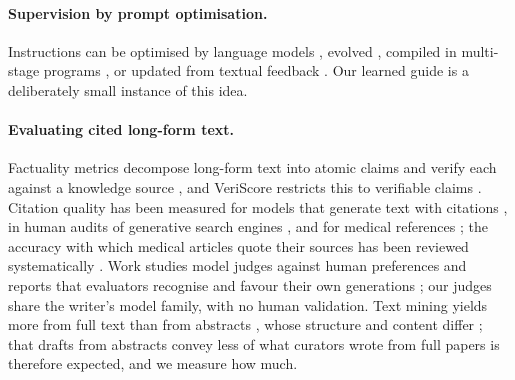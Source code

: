 \documentclass{article} %
\begin{document}
\paragraph{Supervision by prompt optimisation.}
Instructions can be optimised by language models \citep{Zhou2022LargeLanguage,Pryzant2023AutomaticPrompt,Yang2023LargeLanguage}, evolved \citep{Guo2023EvopromptConnecting,Fernando2023PromptbreederSelfreferential,agrawal2026gepa}, compiled in multi-stage programs \citep{Khattab2023DspyCompiling,Opsahlong2024OptimizingInstructions}, or updated from textual feedback \citep{Yuksekgonul2024TextgradAutomatic}. Our learned guide is a deliberately small instance of this idea.

\paragraph{Evaluating cited long-form text.}
Factuality metrics decompose long-form text into atomic claims and verify each against a knowledge source \citep{min2023factscore,wei2024longform}, and VeriScore restricts this to verifiable claims \citep{Song2024VeriscoreEvaluating}. Citation quality has been measured for models that generate text with citations \citep{gao2023enabling}, in human audits of generative search engines \citep{Liu2023EvaluatingVerifiability}, and for medical references \citep{wu2025automated}; the accuracy with which medical articles quote their sources has been reviewed systematically \citep{jergas2015quotation}. Work studies model judges against human preferences \citep{zheng2023judging,shankar2024who} and reports that evaluators recognise and favour their own generations \citep{panickssery2024llm}; our judges share the writer's model family, with no human validation. Text mining yields more from full text than from abstracts \citep{Westergaard2018ComprehensiveQuantitative}, whose structure and content differ \citep{Cohen2010StructuralContent}; that drafts from abstracts convey less of what curators wrote from full papers is therefore expected, and we measure how much.
\end{document}
